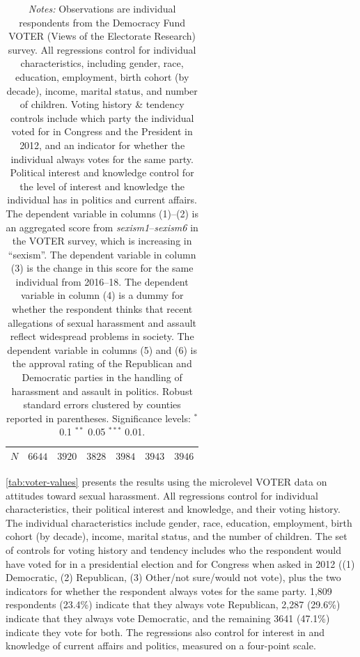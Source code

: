 \documentclass[manuscript,screen,nonacm,11pt,acm]{acmart}
\begin{document}
\begin{bibunit}
\begin{table}[ht]
\begin{adjustbox}{max width=1\textwidth}
\begin{tabular}{@{\hspace{0\tabcolsep}}l*{6}{D{.}{.}{-1}}@{\hspace{0\tabcolsep}}}
$ N $                              &         &         &         &         &         &         \\
			\bottomrule
		\end{tabular}
	\end{adjustbox}
	\caption*{
		\small
		\emph{Notes:}
		Observations are individual respondents from the Democracy Fund VOTER (Views of the Electorate Research) survey.
		All regressions control for individual characteristics, including gender, race, education, employment, birth cohort (by decade), income, marital status, and number of children.
		Voting history \& tendency controls include which party the individual voted for in Congress and the President in 2012, and an indicator for whether the individual always votes for the same party.
		Political interest and knowledge control for the level of interest and knowledge the individual has in politics and current affairs.
		The dependent variable in columns (1)--(2) is an aggregated score from \textit{sexism1}--\textit{sexism6} in the VOTER survey, which is increasing in ``sexism''.
		The dependent variable in column (3) is the change in this score for the same individual from 2016--18.
		The dependent variable in column (4) is a dummy for whether the respondent thinks that recent allegations of sexual harassment and assault reflect widespread problems in society.
		The dependent variable in columns (5) and (6) is the approval rating of the Republican and Democratic parties in the handling of harassment and assault in politics.
		Robust standard errors clustered by counties reported in parentheses.
		Significance levels: $^*$ 0.1 $^{**}$ 0.05 $^{***}$ 0.01.
	}
\end{table}

\cref{tab:voter-values} presents the results using the microlevel VOTER data on attitudes toward sexual harassment.
All regressions control for individual characteristics, their political interest and knowledge, and their voting history.
The individual characteristics include gender, race, education, employment, birth cohort (by decade), income, marital status, and the number of children.
The set of controls for voting history and tendency includes who the respondent would have voted for in a presidential election and for Congress when asked in 2012 ((1) Democratic, (2) Republican, (3) Other/not sure/would not vote), plus the two indicators for whether the respondent always votes for the same party.
1,809 respondents (23.4\%) indicate that they always vote Republican, 2,287 (29.6\%) indicate that they always vote Democratic, and the remaining 3641 (47.1\%) indicate they vote for both.
The regressions also control for interest in and knowledge of current affairs and politics, measured on a four-point scale.


\end{bibunit}
\end{document}
